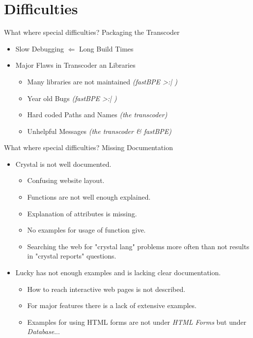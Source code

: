 \documentclass{beamer}
\begin{document}
\section{Difficulties}
	\begin{frame}[fragile]{What where special difficulties?}
		Packaging the Transcoder
		\begin{itemize}[<+->]
			\item Slow Debugging \(\Leftarrow\) Long Build Times
			\item Major Flaws in Transcoder an Libraries
			\begin{itemize}
				\item Many libraries are not maintained \textit{(fastBPE >:| )}
				\item Year old Bugs \textit{(fastBPE >:| )}
				\item Hard coded Paths and Names \textit{(the transcoder)}
				\item Unhelpful Messages \textit{(the transcoder \& fastBPE)}
			\end{itemize}
		\end{itemize}
	\end{frame}
	\begin{frame}[fragile]{What where special difficulties?}
		Missing Documentation
		\begin{itemize}[<+->]
			\item Crystal is not well documented.
				\begin{itemize}
					\item Confusing website layout.
					\item Functions are not well enough explained.
					\item Explanation of attributes is missing.
					\item No examples for usage of function give.
					\item Searching the web for "crystal lang" problems more often than not results in "crystal reports" questions.
				\end{itemize}
			\item Lucky has not enough examples and is lacking clear documentation.
				\begin{itemize}
					\item How to reach interactive web pages is not described.
					\item For major features there is a lack of extensive examples.
					\item Examples for using HTML forms are not under \textit{HTML Forms} but under \textit{Database}...
				\end{itemize}
		\end{itemize}
	\end{frame}
\end{document}
